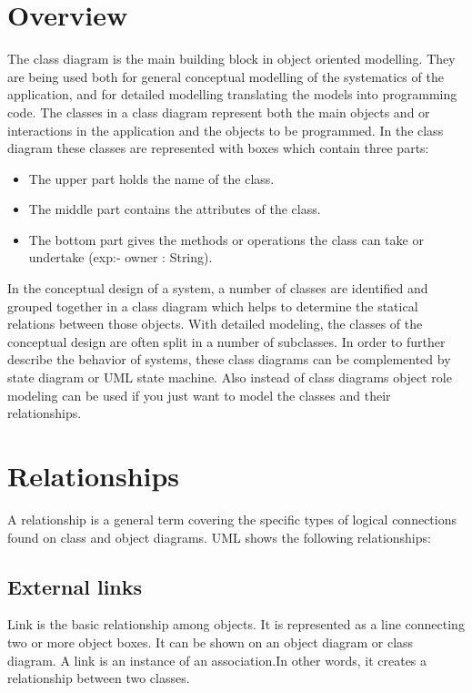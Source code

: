\documentclass[10pt]{article}
\begin{document}
\section{Overview}
The class diagram is the main building block in object oriented modelling. They are being used both for general
conceptual modelling of the systematics of the application, and for detailed modelling translating the models into
programming code. The classes in a class diagram represent both the main objects and or interactions in the
application and the objects to be programmed. In the class diagram these classes are represented with boxes which
contain three parts:
\begin{itemize}
    \item The upper part holds the name of the class.
    \item The middle part contains the attributes of the class.
    \item The bottom part gives the methods or operations the class can take or undertake (exp:- owner : String).
 
\end{itemize}
In the conceptual design of a system, a number of classes are identified and grouped together in a class diagram which helps to determine the statical relations between those objects. With detailed modeling, the classes of the conceptual design are often split in a number of
subclasses.
\vskip10pt%
\noindent
In order to further describe the behavior of systems, these class diagrams can be complemented by state diagram or
UML state machine. Also instead of class diagrams object role modeling can be used if you just want to model the
classes and their relationships.

\section{Relationships}
A relationship is a general term covering the specific types of logical connections found on class and object
diagrams. UML shows the following relationships:
\subsection{External links}
Link is the basic relationship among objects. It is represented as a line connecting two or more object boxes. It can
be shown on an object diagram or class diagram. A link is an instance of an association.In other words, it creates a
relationship between two classes.
\end{document}
